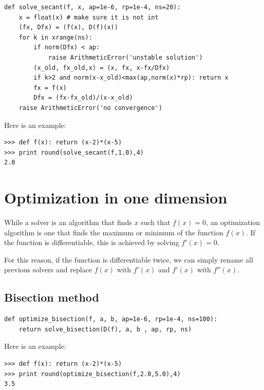 \documentclass[justified,sixbynine]{tufte-book}
\def\ft{\small\tt}
\theoremstyle{plain}%
\theoremstyle{definition}
\theoremstyle{remark}
\begin{document}
\begin{fullwidth}
\begin{lstlisting}[caption={in file: {\ft nlib.py}}]
def solve_secant(f, x, ap=1e-6, rp=1e-4, ns=20):
    x = float(x) # make sure it is not int
    (fx, Dfx) = (f(x), D(f)(x))
    for k in xrange(ns):
        if norm(Dfx) < ap:
            raise ArithmeticError('unstable solution')
        (x_old, fx_old,x) = (x, fx, x-fx/Dfx)
        if k>2 and norm(x-x_old)<max(ap,norm(x)*rp): return x
        fx = f(x)
        Dfx = (fx-fx_old)/(x-x_old)
    raise ArithmeticError('no convergence')
\end{lstlisting}

Here is an example:

\begin{lstlisting}[caption={in file: {\ft nlib.py}}]
>>> def f(x): return (x-2)*(x-5)
>>> print round(solve_secant(f,1.0),4)
2.0
\end{lstlisting}

\goodbreak\section{Optimization in one dimension}


While a solver is an algorithm that finds $x$ such that $f(x)=0$, an optimization algorithm is one that finds the maximum or minimum of the function $f(x)$. If the function is differentiable, this is achieved by solving $f'(x)=0$.

For this reason, if the function is differentiable twice, we can simply rename all previous solvers and replace $f(x)$ with $f'(x)$ and $f'(x)$ with $f''(x)$.

\goodbreak\subsection{Bisection method}


\begin{lstlisting}[caption={in file: {\ft nlib.py}}]
def optimize_bisection(f, a, b, ap=1e-6, rp=1e-4, ns=100):
    return solve_bisection(D(f), a, b , ap, rp, ns)
\end{lstlisting}

Here is an example:

\begin{lstlisting}[caption={in file: {\ft nlib.py}}]
>>> def f(x): return (x-2)*(x-5)
>>> print round(optimize_bisection(f,2.0,5.0),4)
3.5
\end{lstlisting}


\end{fullwidth}
\end{document}
